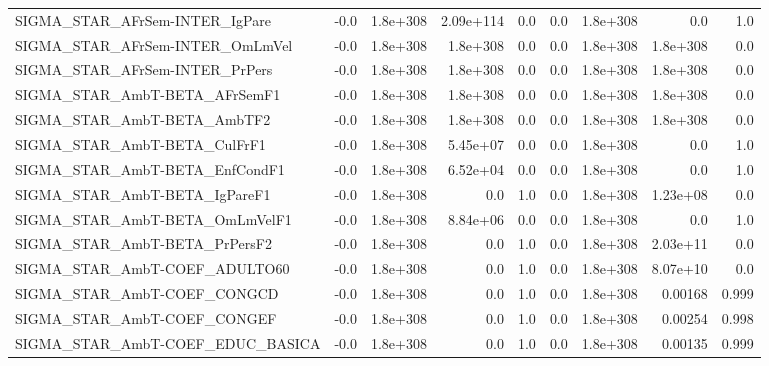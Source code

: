 \begin{tabular}{lrrrrrrrr}
SIGMA\_STAR\_AFrSem-INTER\_IgPare        &        -0.0 &     1.8e+308 &  2.09e+114 &      0.0 &        0.0 &    1.8e+308 &          0.0 &           1.0 \\
SIGMA\_STAR\_AFrSem-INTER\_OmLmVel       &        -0.0 &     1.8e+308 &   1.8e+308 &      0.0 &        0.0 &    1.8e+308 &     1.8e+308 &           0.0 \\
SIGMA\_STAR\_AFrSem-INTER\_PrPers        &        -0.0 &     1.8e+308 &   1.8e+308 &      0.0 &        0.0 &    1.8e+308 &     1.8e+308 &           0.0 \\
SIGMA\_STAR\_AmbT-BETA\_AFrSemF1         &        -0.0 &     1.8e+308 &   1.8e+308 &      0.0 &        0.0 &    1.8e+308 &     1.8e+308 &           0.0 \\
SIGMA\_STAR\_AmbT-BETA\_AmbTF2           &        -0.0 &     1.8e+308 &   1.8e+308 &      0.0 &        0.0 &    1.8e+308 &     1.8e+308 &           0.0 \\
SIGMA\_STAR\_AmbT-BETA\_CulFrF1          &        -0.0 &     1.8e+308 &   5.45e+07 &      0.0 &        0.0 &    1.8e+308 &          0.0 &           1.0 \\
SIGMA\_STAR\_AmbT-BETA\_EnfCondF1        &        -0.0 &     1.8e+308 &   6.52e+04 &      0.0 &        0.0 &    1.8e+308 &          0.0 &           1.0 \\
SIGMA\_STAR\_AmbT-BETA\_IgPareF1         &        -0.0 &     1.8e+308 &        0.0 &      1.0 &        0.0 &    1.8e+308 &     1.23e+08 &           0.0 \\
SIGMA\_STAR\_AmbT-BETA\_OmLmVelF1        &        -0.0 &     1.8e+308 &   8.84e+06 &      0.0 &        0.0 &    1.8e+308 &          0.0 &           1.0 \\
SIGMA\_STAR\_AmbT-BETA\_PrPersF2         &        -0.0 &     1.8e+308 &        0.0 &      1.0 &        0.0 &    1.8e+308 &     2.03e+11 &           0.0 \\
SIGMA\_STAR\_AmbT-COEF\_ADULTO60         &        -0.0 &     1.8e+308 &        0.0 &      1.0 &        0.0 &    1.8e+308 &     8.07e+10 &           0.0 \\
SIGMA\_STAR\_AmbT-COEF\_CONGCD           &        -0.0 &     1.8e+308 &        0.0 &      1.0 &        0.0 &    1.8e+308 &      0.00168 &         0.999 \\
SIGMA\_STAR\_AmbT-COEF\_CONGEF           &        -0.0 &     1.8e+308 &        0.0 &      1.0 &        0.0 &    1.8e+308 &      0.00254 &         0.998 \\
SIGMA\_STAR\_AmbT-COEF\_EDUC\_BASICA      &        -0.0 &     1.8e+308 &        0.0 &      1.0 &        0.0 &    1.8e+308 &      0.00135 &         0.999 \\

\end{tabular}
